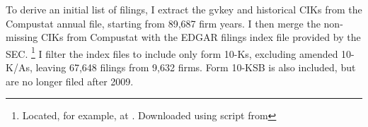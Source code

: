 \noindent

To derive an initial list of filings, I extract the gvkey and historical CIKs from the Compustat annual file, starting from 89,687 firm years.
I then merge the non-missing CIKs from Compustat with the EDGAR filings index file provided by the SEC.%
  \footnote{Located, for example, at
            .
            Downloaded using script from
            }
I filter the index files to include only form 10-Ks, excluding amended 10-K/As, leaving 67,648 filings from 9,632 firms.
Form 10-KSB is also included, but are no longer filed after 2009.